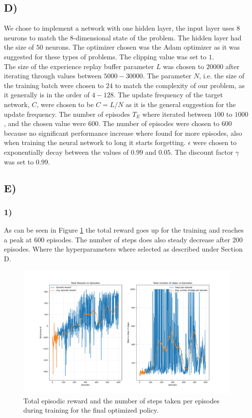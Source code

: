 \documentclass{article}
\begin{document}
\subsection*{D)}
We chose to implement a network with one hidden layer, the input layer uses $8$ neurons to match the 8-dimensional state of the problem. The hidden layer had the size of $50$ neurons. The optimizer chosen was the Adam optimizer as it was suggested for these types of problems. The clipping value was set to $1$.\\
\noindent The size of the experience replay buffer parameter $L$ was chosen to $20000$ after iterating through values between $5000 - 30000$. The parameter $N$, i.e. the size of the training batch were chosen to $24$ to match the complexity of our problem, as it generally is in the order of $4 - 128$.
The update frequency of the target network, $C$, were chosen to be $C = L/N$ as it is the general suggestion for the update frequency. The number of episodes $T_E$ where iterated between $100$ to $1000$, and the chosen value were $600$. The number of episodes were chosen to $600$ because no significant performance increase where found for more episodes, also when training the neural network to long it starts forgetting. $\epsilon$ were chosen to exponentially decay between the values of $0.99$ and $0.05$. The discount factor $\gamma$ was set to $0.99$. 

\subsection*{E)}
\subsubsection*{1)}
As can be seen in Figure \ref{fig:Policy} the total reward goes up for the training and reaches a peak at 600 episodes. The number of steps does also steady decrease after 200 episodes. Where the hyperparameters where selected as described under Section D.
\begin{figure}[H]
    \centering
    \includegraphics[width=1\textwidth]{Lab_2/problem1/images/main_network_2.png}
    \caption{\small Total episodic reward and the number of steps taken per episodes during training for the final optimized policy. }
    \label{fig:Policy}
\end{figure}
\end{document}
